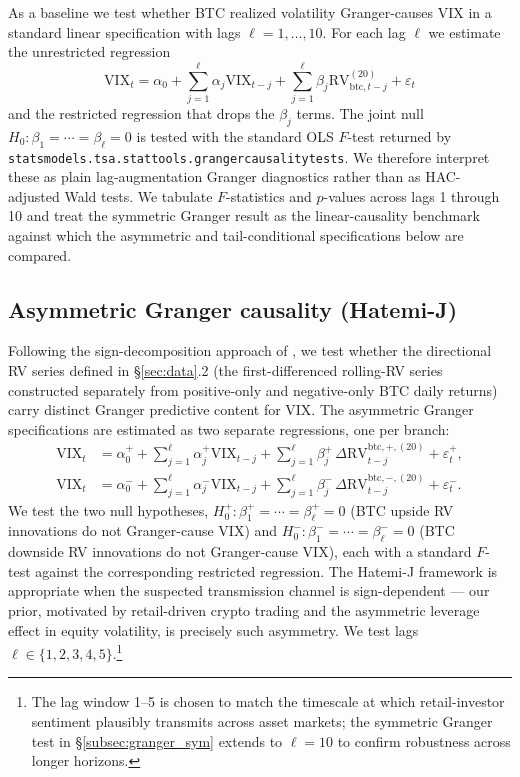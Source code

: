 \documentclass[11pt,a4paper]{article}
\begin{document}
As a baseline we test whether BTC realized volatility Granger-causes VIX in a standard linear specification with lags $\ell = 1, \ldots, 10$. For each lag $\ell$ we estimate the unrestricted regression
\begin{equation}
\text{VIX}_t = \alpha_0 + \sum_{j=1}^{\ell} \alpha_j \text{VIX}_{t-j} + \sum_{j=1}^{\ell} \beta_j \text{RV}^{(20)}_{\text{btc}, t-j} + \varepsilon_t
\label{eq:granger_unrestricted}
\end{equation}
and the restricted regression that drops the $\beta_j$ terms. The joint null $H_0: \beta_1 = \cdots = \beta_\ell = 0$ is tested with the standard OLS $F$-test returned by \texttt{statsmodels.tsa.stattools.grangercausalitytests}. We therefore interpret these as plain lag-augmentation Granger diagnostics rather than as HAC-adjusted Wald tests. We tabulate $F$-statistics and $p$-values across lags 1 through 10 and treat the symmetric Granger result as the linear-causality benchmark against which the asymmetric and tail-conditional specifications below are compared.

\subsection{Asymmetric Granger causality (Hatemi-J)}
\label{subsec:granger_asym}

Following the sign-decomposition approach of \citet{hatemi2012}, we test whether the directional RV series defined in \S\ref{sec:data}.2 (the first-differenced rolling-RV series constructed separately from positive-only and negative-only BTC daily returns) carry distinct Granger predictive content for VIX. The asymmetric Granger specifications are estimated as two separate regressions, one per branch:
\begin{equation}
\begin{aligned}
\text{VIX}_t &= \alpha^+_0 + \sum_{j=1}^{\ell} \alpha^+_j \text{VIX}_{t-j} + \sum_{j=1}^{\ell} \beta^{+}_j \, \Delta \text{RV}^{\text{btc},+,(20)}_{t-j} + \varepsilon^+_t, \\
\text{VIX}_t &= \alpha^-_0 + \sum_{j=1}^{\ell} \alpha^-_j \text{VIX}_{t-j} + \sum_{j=1}^{\ell} \beta^{-}_j \, \Delta \text{RV}^{\text{btc},-,(20)}_{t-j} + \varepsilon^-_t.
\end{aligned}
\label{eq:granger_asym}
\end{equation}
We test the two null hypotheses, $H_0^+: \beta^{+}_1 = \cdots = \beta^{+}_\ell = 0$ (BTC upside RV innovations do not Granger-cause VIX) and $H_0^-: \beta^{-}_1 = \cdots = \beta^{-}_\ell = 0$ (BTC downside RV innovations do not Granger-cause VIX), each with a standard $F$-test against the corresponding restricted regression. The Hatemi-J framework is appropriate when the suspected transmission channel is sign-dependent --- our prior, motivated by retail-driven crypto trading and the asymmetric leverage effect in equity volatility, is precisely such asymmetry. We test lags $\ell \in \{1, 2, 3, 4, 5\}$.\footnote{The lag window 1--5 is chosen to match the timescale at which retail-investor sentiment plausibly transmits across asset markets; the symmetric Granger test in \S\ref{subsec:granger_sym} extends to $\ell = 10$ to confirm robustness across longer horizons.}
\end{document}
